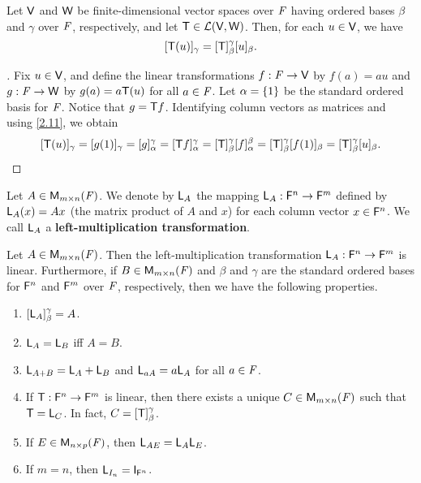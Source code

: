 \begin{thm}\label{2.14}
  Let \(\mathsf{V}\) and \(\mathsf{W}\) be finite-dimensional vector spaces over \(\mathit{F}\) having ordered bases \(\beta\) and \(\gamma\) over \(\mathit{F}\), respectively, and let \(\mathsf{T} \in \mathcal{L}(\mathsf{V}, \mathsf{W})\).
  Then, for each \(u \in \mathsf{V}\), we have
  \[
    [\mathsf{T}(u)]_{\gamma} = [\mathsf{T}]_{\beta}^{\gamma} [u]_{\beta}.
  \]
\end{thm}

\begin{proof}[]
  Fix \(u \in \mathsf{V}\), and define the linear transformations \(f : \mathit{F} \to \mathsf{V}\) by \(f(a) = au\) and \(g : \mathit{F} \to \mathsf{W}\) by \(g(a) = a \mathsf{T}(u)\) for all \(a \in \mathit{F}\).
  Let \(\alpha = \left\lbrace1\right\rbrace\) be the standard ordered basis for \(\mathit{F}\).
  Notice that \(g = \mathsf{T} f\).
  Identifying column vectors as matrices and using \cref{2.11}, we obtain
  \[
    [\mathsf{T}(u)]_{\gamma} = [g(1)]_{\gamma} = [g]_{\alpha}^{\gamma} = [\mathsf{T} f]_{\alpha}^{\gamma} = [\mathsf{T}]_{\beta}^{\gamma} [f]_{\alpha}^{\beta} = [\mathsf{T}]_{\beta}^{\gamma} [f(1)]_{\beta} = [\mathsf{T}]_{\beta}^{\gamma} [u]_{\beta}.
  \]
\end{proof}

\begin{defn}\label{2.3.8}
  Let \(A \in \ms[m][n][\F]\).
  We denote by \(\mathsf{L}_A\) the mapping \(\mathsf{L}_A : \mathsf{F}^n \to \mathsf{F}^m\) defined by \(\mathsf{L}_A(x) = Ax\) (the matrix product of \(A\) and \(x\)) for each column vector \(x \in \mathsf{F}^n\).
  We call \(\mathsf{L}_A\) a \textbf{left-multiplication transformation}.
\end{defn}

\begin{thm}\label{2.15}
  Let \(A \in \ms\).
  Then the left-multiplication transformation \(\mathsf{L}_A : \mathsf{F}^n \to \mathsf{F}^m\) is linear.
  Furthermore, if \(B \in \ms\) and \(\beta\) and \(\gamma\) are the standard ordered bases for \(\mathsf{F}^n\) and \(\mathsf{F}^m\) over \(\mathit{F}\), respectively, then we have the following properties.
  \begin{enumerate}
    \item \([\mathsf{L}_A]_{\beta}^{\gamma} = A\).
    \item \(\mathsf{L}_A = \mathsf{L}_B\) iff \(A = B\).
    \item \(\mathsf{L}_{A + B} = \mathsf{L}_A + \mathsf{L}_B\) and \(\mathsf{L}_{aA} = a \mathsf{L}_A\) for all \(a \in \mathit{F}\).
    \item If \(\mathsf{T} : \mathsf{F}^n \to \mathsf{F}^m\) is linear, then there exists a unique \(C \in \ms\) such that \(\mathsf{T} = \mathsf{L}_C\).
          In fact, \(C = [\mathsf{T}]_{\beta}^{\gamma}\).
    \item If \(E \in \ms[n][p][\F]\), then \(\mathsf{L}_{AE} = \mathsf{L}_A \mathsf{L}_E\).
    \item If \(m = n\), then \(\L_{I_n} = \IT[\vs{F}^n]\).
  \end{enumerate}
\end{thm}

